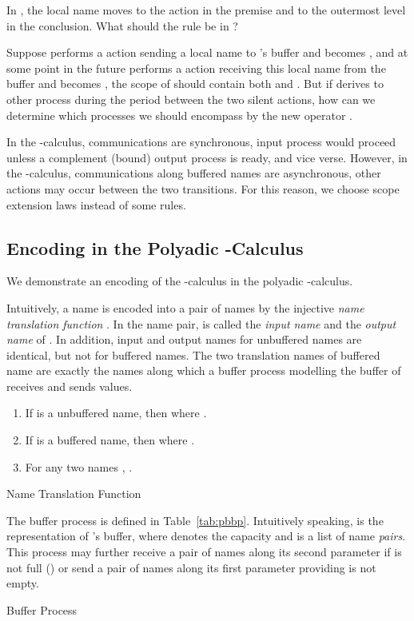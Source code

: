 \documentclass[runningheads, envcountsame, a4paper]{llncs}
\begin{document}
In , the local name moves to the action in the premise and to the outermost level in the conclusion.
What should the rule be in ?

Suppose  performs a  action sending a local name  to 's buffer and becomes ,
and at some point in the future  performs a  action receiving this local name from the buffer and becomes ,
the scope of  should contain both  and .
But if  derives to other process during the period between the two silent actions,
how can we determine which processes we should encompass by the new operator .

In the -calculus, communications are synchronous, input process would proceed unless a
complement (bound) output process is ready, and vice verse.
However, in the -calculus, communications along buffered names are asynchronous,
other actions may occur between the two transitions.
For this reason, we choose scope extension laws instead of some  rules.



\subsection{Encoding in the Polyadic -Calculus}

We demonstrate an encoding of the -calculus in the polyadic -calculus.

Intuitively, a  name  is encoded into a pair of  names  by the injective \emph{name translation function} .
In the name pair,  is called the \emph{input name} and  the \emph{output name} of .
In addition, input and output names for unbuffered names are identical, but not for buffered names.
The two translation names of buffered name  are exactly the names along which a buffer process
modelling the buffer of  receives and sends values.
\begin{table}
    \begin{enumerate}
      \item If  is a unbuffered name, then  where .
      \item If  is a buffered name, then  where .
      \item For any two names , .
    \end{enumerate}
    \caption{Name Translation Function }
    \label{tab:pbnt}
\end{table}

The buffer process is defined in Table~\ref{tab:pbbp}.
Intuitively speaking,  is the  representation of 's buffer, where  denotes the capacity and  is a list of  name \emph{pairs}.
This process may further receive a pair of names along its second parameter  if  is not full ()
or send a pair of names along its first parameter  providing  is not empty.
\begin{table}

\caption{Buffer Process }
\label{tab:pbbp}
\end{table}
\end{document}
